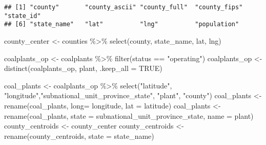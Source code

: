 \documentclass[
]{article}
\newenvironment{Shaded}{\begin{snugshade}}{\end{snugshade}}
\newcommand{\AttributeTok}[1]{\textcolor[rgb]{0.77,0.63,0.00}{#1}}
\newcommand{\ConstantTok}[1]{\textcolor[rgb]{0.00,0.00,0.00}{#1}}
\newcommand{\FunctionTok}[1]{\textcolor[rgb]{0.00,0.00,0.00}{#1}}
\newcommand{\NormalTok}[1]{#1}
\newcommand{\OtherTok}[1]{\textcolor[rgb]{0.56,0.35,0.01}{#1}}
\newcommand{\SpecialCharTok}[1]{\textcolor[rgb]{0.00,0.00,0.00}{#1}}
\newcommand{\StringTok}[1]{\textcolor[rgb]{0.31,0.60,0.02}{#1}}
\begin{document}
\begin{verbatim}
## [1] "county"       "county_ascii" "county_full"  "county_fips"  "state_id"    
## [6] "state_name"   "lat"          "lng"          "population"
\end{verbatim}

\begin{Shaded}
\begin{Highlighting}[]
\NormalTok{county\_center }\OtherTok{\textless{}{-}}\NormalTok{ counties }\SpecialCharTok{\%\textgreater{}\%} \FunctionTok{select}\NormalTok{(county, state\_name, lat, lng)}
\end{Highlighting}
\end{Shaded}

\begin{Shaded}
\begin{Highlighting}[]
\NormalTok{coalplants\_op }\OtherTok{\textless{}{-}}\NormalTok{ coalplants }\SpecialCharTok{\%\textgreater{}\%} \FunctionTok{filter}\NormalTok{(status }\SpecialCharTok{==} \StringTok{"operating"}\NormalTok{)}
\NormalTok{coalplants\_op }\OtherTok{\textless{}{-}} \FunctionTok{distinct}\NormalTok{(coalplants\_op, plant, }\AttributeTok{.keep\_all =} \ConstantTok{TRUE}\NormalTok{)}
\end{Highlighting}
\end{Shaded}

\begin{Shaded}
\begin{Highlighting}[]
\NormalTok{coal\_plants }\OtherTok{\textless{}{-}}\NormalTok{ coalplants\_op }\SpecialCharTok{\%\textgreater{}\%} \FunctionTok{select}\NormalTok{(}\StringTok{"latitude"}\NormalTok{, }\StringTok{"longitude"}\NormalTok{,}\StringTok{"subnational\_unit\_province\_state"}\NormalTok{, }\StringTok{"plant"}\NormalTok{, }\StringTok{"county"}\NormalTok{)}
\NormalTok{coal\_plants }\OtherTok{\textless{}{-}} \FunctionTok{rename}\NormalTok{(coal\_plants, }\AttributeTok{long=}\NormalTok{ longitude, }\AttributeTok{lat =}\NormalTok{ latitude)}
\NormalTok{coal\_plants }\OtherTok{\textless{}{-}} \FunctionTok{rename}\NormalTok{(coal\_plants, }\AttributeTok{state =}\NormalTok{ subnational\_unit\_province\_state, }\AttributeTok{name =}\NormalTok{ plant)}
\NormalTok{county\_centroids }\OtherTok{\textless{}{-}}\NormalTok{ county\_center}
\NormalTok{county\_centroids }\OtherTok{\textless{}{-}} \FunctionTok{rename}\NormalTok{(county\_centroids, }\AttributeTok{state =}\NormalTok{ state\_name)}
\end{Highlighting}
\end{Shaded}
\end{document}
